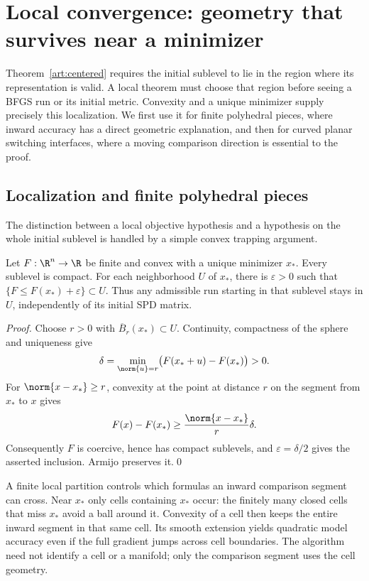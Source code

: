 \section{Local convergence: geometry that survives near a minimizer}\label{art:local}\label{art:positive}

Theorem~\ref{art:centered} requires the initial sublevel to lie in the region where
its representation is valid. A local theorem must choose that region before
seeing a BFGS run or its initial metric. Convexity and a unique minimizer
supply precisely this localization. We first use it for finite polyhedral
pieces, where inward accuracy has a direct geometric explanation, and then
for curved planar switching interfaces, where a moving comparison direction
is essential to the proof.

\subsection{Localization and finite polyhedral pieces}

The distinction between a local objective hypothesis and a hypothesis on the
whole initial sublevel is handled by a simple convex trapping argument.

\begin{lemma}\label{art:localization}
Let $F:\R^n\to\R$ be finite and convex with a unique minimizer $x_*$.
Every sublevel is compact. For each neighborhood $U$ of $x_*$, there is
$\varepsilon>0$ such that $\{F\le F(x_*)+\varepsilon\}\subset U$.
Thus any admissible run starting in that sublevel stays in $U$, independently
of its initial SPD matrix.
\end{lemma}
\begin{proof}
Choose $r>0$ with $\overline B_r(x_*)\subset U$.
Continuity, compactness of the sphere and uniqueness give
\[
 \delta=\min_{\norm{u}=r}\bigl(F(x_*+u)-F(x_*)\bigr)>0.
\]
For $\norm{x-x_*}\ge r$, convexity at the point at distance $r$ on the
segment from $x_*$ to $x$ gives
\[
 F(x)-F(x_*)\ge\frac{\norm{x-x_*}}r\delta.
\]
Consequently $F$ is coercive, hence has compact sublevels, and
$\varepsilon=\delta/2$ gives the asserted inclusion. Armijo preserves it.\qed
\end{proof}

A finite local partition controls which formulas an inward comparison segment
can cross. Near $x_*$ only cells containing $x_*$ occur: the finitely many
closed cells that miss $x_*$ avoid a ball around it. Convexity of a cell then keeps the entire
inward segment in that same cell. Its smooth extension yields quadratic
model accuracy even if the full gradient jumps across cell boundaries.
The algorithm need not identify a cell or a manifold; only the comparison
segment uses the cell geometry.

